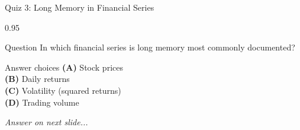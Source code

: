 \documentclass[9pt, aspectratio=169, t]{beamer}
\begin{document}
\begin{frame}{Quiz 3: Long Memory in Financial Series}
    \begin{cminipage}{0.95\textwidth}
    \begin{alertblock}{Question}
        In which financial series is long memory most commonly documented?
    \end{alertblock}

    \vspace{0.4cm}

    \begin{block}{Answer choices}
        \textcolor{MainBlue}{\textbf{(A)}} Stock prices\\[3pt]
        \textcolor{MainBlue}{\textbf{(B)}} Daily returns\\[3pt]
        \textcolor{MainBlue}{\textbf{(C)}} Volatility (squared returns)\\[3pt]
        \textcolor{MainBlue}{\textbf{(D)}} Trading volume
    \end{block}

    \vspace{0.5cm}

    \begin{center}
        \textit{Answer on next slide...}
    \end{center}
    \end{cminipage}
\end{frame}
\end{document}
